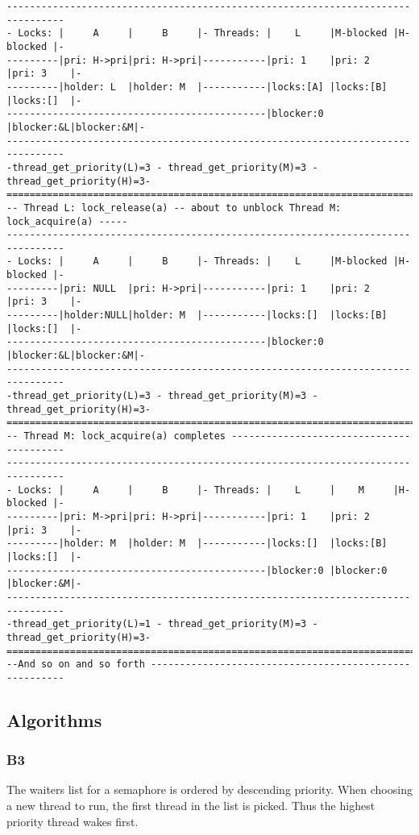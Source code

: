 \documentclass[a4wide, 11pt]{article}
\begin{document}
\begin{verbatim}
--------------------------------------------------------------------------------
- Locks: |     A     |     B     |- Threads: |    L     |M-blocked |H-blocked |-
---------|pri: H->pri|pri: H->pri|-----------|pri: 1    |pri: 2    |pri: 3    |-
---------|holder: L  |holder: M  |-----------|locks:[A] |locks:[B] |locks:[]  |-
---------------------------------------------|blocker:0 |blocker:&L|blocker:&M|-
--------------------------------------------------------------------------------
-thread_get_priority(L)=3 - thread_get_priority(M)=3 - thread_get_priority(H)=3-
================================================================================
-- Thread L: lock_release(a) -- about to unblock Thread M: lock_acquire(a) -----
--------------------------------------------------------------------------------
- Locks: |     A     |     B     |- Threads: |    L     |M-blocked |H-blocked |-
---------|pri: NULL  |pri: H->pri|-----------|pri: 1    |pri: 2    |pri: 3    |-
---------|holder:NULL|holder: M  |-----------|locks:[]  |locks:[B] |locks:[]  |-
---------------------------------------------|blocker:0 |blocker:&L|blocker:&M|-
--------------------------------------------------------------------------------
-thread_get_priority(L)=3 - thread_get_priority(M)=3 - thread_get_priority(H)=3-
================================================================================
-- Thread M: lock_acquire(a) completes -----------------------------------------
--------------------------------------------------------------------------------
- Locks: |     A     |     B     |- Threads: |    L     |    M     |H-blocked |-
---------|pri: M->pri|pri: H->pri|-----------|pri: 1    |pri: 2    |pri: 3    |-
---------|holder: M  |holder: M  |-----------|locks:[]  |locks:[B] |locks:[]  |-
---------------------------------------------|blocker:0 |blocker:0 |blocker:&M|-
--------------------------------------------------------------------------------
-thread_get_priority(L)=1 - thread_get_priority(M)=3 - thread_get_priority(H)=3-
================================================================================
--And so on and so forth -------------------------------------------------------
\end{verbatim}

\subsection{Algorithms}
\subsubsection{B3}
The waiters list for a semaphore is ordered by descending priority. When choosing a new thread to run, the first thread in the list is picked. Thus the highest priority thread wakes first.
\end{document}
